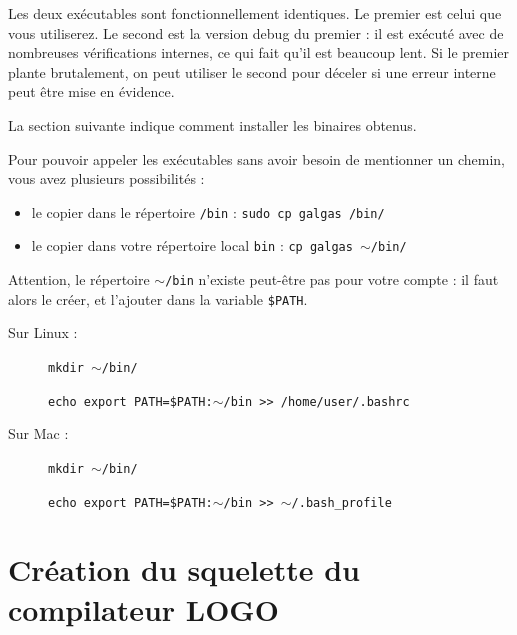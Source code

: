 Les deux exécutables sont fonctionnellement identiques. Le premier est celui que vous utiliserez. Le second est la version debug du premier : il est exécuté avec de nombreuses vérifications internes, ce qui fait qu’il est beaucoup lent. Si le premier plante brutalement, on peut utiliser le second pour déceler si une erreur interne peut être mise en évidence.

La section suivante indique comment installer les binaires obtenus.



Pour pouvoir appeler les exécutables sans avoir besoin de mentionner un chemin, vous avez plusieurs possibilités :
\begin{itemize}
  \item le copier dans le répertoire \texttt{/bin} :  \texttt{sudo cp galgas /bin/}
  \item le copier dans votre répertoire local \texttt{bin} : \texttt{cp galgas $\sim$/bin/}
\end{itemize}

Attention, le répertoire \texttt{$\sim$/bin} n'existe peut-être pas pour votre compte : il faut alors le créer, et l'ajouter dans la variable \texttt{\$PATH}.

Sur Linux :
\begin{description}
  \item[ ] \texttt{mkdir $\sim$/bin/}
  \item[ ] \texttt{echo \textquotesingle export~PATH=\$PATH:$\sim$/bin\textquotesingle~\textgreater{}\textgreater~/home/user/.bashrc}
\end{description}

Sur Mac :
\begin{description}
  \item[ ] \texttt{mkdir $\sim$/bin/}
  \item[ ] \texttt{echo \textquotesingle export~PATH=\$PATH:$\sim$/bin\textquotesingle~\textgreater{}\textgreater~$\sim$/.bash\_profile}
\end{description}













\section{Création du squelette du compilateur LOGO}


